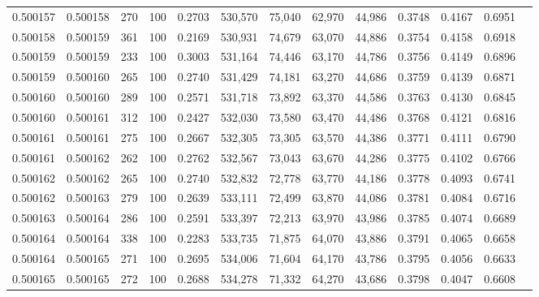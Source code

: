 \begin{tabular}{rrrrrrrrrrrrr}
0.500157 & 0.500158 &   270 & 100 &                                     0.2703 & 530,570 &  75,040 &  62,970 &  44,986 & 0.3748 & 0.4167 & 0.6951 \\
0.500158 & 0.500159 &   361 & 100 &                                     0.2169 & 530,931 &  74,679 &  63,070 &  44,886 & 0.3754 & 0.4158 & 0.6918 \\
0.500159 & 0.500159 &   233 & 100 &                                     0.3003 & 531,164 &  74,446 &  63,170 &  44,786 & 0.3756 & 0.4149 & 0.6896 \\
0.500159 & 0.500160 &   265 & 100 &                                     0.2740 & 531,429 &  74,181 &  63,270 &  44,686 & 0.3759 & 0.4139 & 0.6871 \\
0.500160 & 0.500160 &   289 & 100 &                                     0.2571 & 531,718 &  73,892 &  63,370 &  44,586 & 0.3763 & 0.4130 & 0.6845 \\
0.500160 & 0.500161 &   312 & 100 &                                     0.2427 & 532,030 &  73,580 &  63,470 &  44,486 & 0.3768 & 0.4121 & 0.6816 \\
0.500161 & 0.500161 &   275 & 100 &                                     0.2667 & 532,305 &  73,305 &  63,570 &  44,386 & 0.3771 & 0.4111 & 0.6790 \\
0.500161 & 0.500162 &   262 & 100 &                                     0.2762 & 532,567 &  73,043 &  63,670 &  44,286 & 0.3775 & 0.4102 & 0.6766 \\
0.500162 & 0.500162 &   265 & 100 &                                     0.2740 & 532,832 &  72,778 &  63,770 &  44,186 & 0.3778 & 0.4093 & 0.6741 \\
0.500162 & 0.500163 &   279 & 100 &                                     0.2639 & 533,111 &  72,499 &  63,870 &  44,086 & 0.3781 & 0.4084 & 0.6716 \\
0.500163 & 0.500164 &   286 & 100 &                                     0.2591 & 533,397 &  72,213 &  63,970 &  43,986 & 0.3785 & 0.4074 & 0.6689 \\
0.500164 & 0.500164 &   338 & 100 &                                     0.2283 & 533,735 &  71,875 &  64,070 &  43,886 & 0.3791 & 0.4065 & 0.6658 \\
0.500164 & 0.500165 &   271 & 100 &                                     0.2695 & 534,006 &  71,604 &  64,170 &  43,786 & 0.3795 & 0.4056 & 0.6633 \\
0.500165 & 0.500165 &   272 & 100 &                                     0.2688 & 534,278 &  71,332 &  64,270 &  43,686 & 0.3798 & 0.4047 & 0.6608 \\

\end{tabular}
